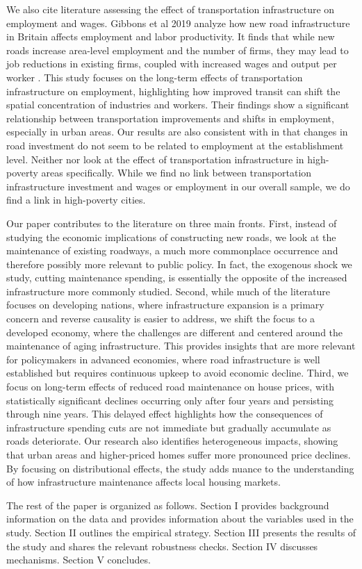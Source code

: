 We also cite literature assessing the effect of transportation infrastructure on employment and wages. Gibbons et al 2019 analyze how new road infrastructure in Britain affects employment and labor productivity. It finds that while new roads increase area-level employment and the number of firms, they may lead to job reductions in existing firms, coupled with increased wages and output per worker \citep{duranton2012}. This study focuses on the long-term effects of transportation infrastructure on employment, highlighting how improved transit can shift the spatial concentration of industries and workers. Their findings show a significant relationship between transportation improvements and shifts in employment, especially in urban areas. Our results are also consistent with \cite{gibbons2019new} in that changes in road investment do not seem to be related to employment at the establishment level.  Neither \cite{dalenberg1995effects} nor \cite{gibbons2019new} look at the effect of transportation infrastructure in high-poverty areas specifically.  While we find no link between transportation infrastructure investment and wages or employment in our overall sample, we do find a link in high-poverty cities.

Our paper contributes to the literature on three main fronts. First, instead of studying the economic implications of constructing new roads, we look at the maintenance of existing roadways, a much more commonplace occurrence and therefore possibly more relevant to public policy. In fact, the exogenous shock we study, cutting maintenance spending, is essentially the opposite of the increased infrastructure more commonly studied.  
Second, while much of the literature focuses on developing nations, where infrastructure expansion is a primary concern and reverse causality is easier to address, we shift the focus to a developed economy, where the challenges are different and centered around the maintenance of aging infrastructure. This provides insights that are more relevant for policymakers in advanced economies, where road infrastructure is well established but requires continuous upkeep to avoid economic decline.
Third, we focus on long-term effects of reduced road maintenance on house prices, with statistically significant declines occurring only after four years and persisting through nine years. This delayed effect highlights how the consequences of infrastructure spending cuts are not immediate but gradually accumulate as roads deteriorate. Our research also identifies heterogeneous impacts, showing that urban areas and higher-priced homes suffer more pronounced price declines. By focusing on distributional effects, the study adds nuance to the understanding of how infrastructure maintenance affects local housing markets.

The rest of the paper is organized as follows. Section I provides background information on the data and provides information about the variables used in the study. Section II outlines the empirical strategy. Section III presents the results of the study and shares the relevant robustness checks. Section IV discusses mechanisms. Section V concludes.